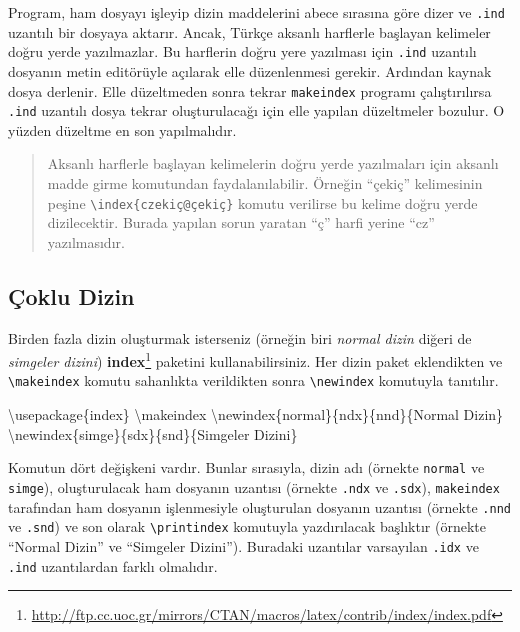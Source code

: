 \documentclass[
  10pt,
]{scrbook}
\newenvironment{Shaded}{}{}
\newcommand{\BuiltInTok}[1]{#1}
\newcommand{\ExtensionTok}[1]{#1}
\newcommand{\FunctionTok}[1]{\textcolor[rgb]{0.02,0.16,0.49}{#1}}
\newcommand{\NormalTok}[1]{#1}
\renewcommand{\href}[2]{#2\footnote{\url{#1}}}
\theoremstyle{definition}
\theoremstyle{definition}
\theoremstyle{definition}
\theoremstyle{definition}
\theoremstyle{remark}
\begin{document}
Program, ham dosyayı işleyip dizin maddelerini abece sırasına göre dizer ve \texttt{.ind} uzantılı bir dosyaya aktarır. Ancak, Türkçe aksanlı harflerle başlayan kelimeler doğru yerde yazılmazlar. Bu harflerin doğru yere yazılması için \texttt{.ind} uzantılı dosyanın metin editörüyle açılarak elle düzenlenmesi gerekir. Ardından kaynak dosya derlenir. Elle düzeltmeden sonra tekrar \texttt{makeindex} programı çalıştırılırsa \texttt{.ind} uzantılı dosya tekrar oluşturulacağı için elle yapılan düzeltmeler bozulur. O yüzden düzeltme en son yapılmalıdır.

\begin{quote}
Aksanlı harflerle başlayan kelimelerin doğru yerde yazılmaları için aksanlı madde girme komutundan faydalanılabilir. Örneğin ``çekiç'' kelimesinin peşine \texttt{\textbackslash{}index\{czekiç@çekiç\}} komutu verilirse bu kelime doğru yerde dizilecektir. Burada yapılan sorun yaratan ``ç'' harfi yerine ``cz'' yazılmasıdır.
\end{quote}

\hypertarget{uxe7oklu-dizin}{%
\subsection{Çoklu Dizin}\label{uxe7oklu-dizin}}

Birden fazla dizin oluşturmak isterseniz (örneğin biri \emph{normal dizin} diğeri de \emph{simgeler dizini}) \href{http://ftp.cc.uoc.gr/mirrors/CTAN/macros/latex/contrib/index/index.pdf}{\textbf{index}} paketini kullanabilirsiniz. Her dizin paket eklendikten ve \texttt{\textbackslash{}makeindex} komutu sahanlıkta verildikten sonra \texttt{\textbackslash{}newindex} komutuyla tanıtılır.

\begin{Shaded}
\begin{Highlighting}[]
\BuiltInTok{\textbackslash{}usepackage}\NormalTok{\{}\ExtensionTok{index}\NormalTok{\}}
\FunctionTok{\textbackslash{}makeindex}
\FunctionTok{\textbackslash{}newindex}\NormalTok{\{normal\}\{ndx\}\{nnd\}\{Normal Dizin\}}
\FunctionTok{\textbackslash{}newindex}\NormalTok{\{simge\}\{sdx\}\{snd\}\{Simgeler Dizini\}}
\end{Highlighting}
\end{Shaded}

Komutun dört değişkeni vardır. Bunlar sırasıyla, dizin adı (örnekte \texttt{normal} ve \texttt{simge}), oluşturulacak ham dosyanın uzantısı (örnekte \texttt{.ndx} ve \texttt{.sdx}), \texttt{makeindex} tarafından ham dosyanın işlenmesiyle oluşturulan dosyanın uzantısı (örnekte \texttt{.nnd} ve \texttt{.snd}) ve son olarak \texttt{\textbackslash{}printindex} komutuyla yazdırılacak başlıktır (örnekte ``Normal Dizin'' ve ``Simgeler Dizini''). Buradaki uzantılar varsayılan \texttt{.idx} ve \texttt{.ind} uzantılardan farklı olmalıdır.
\end{document}
